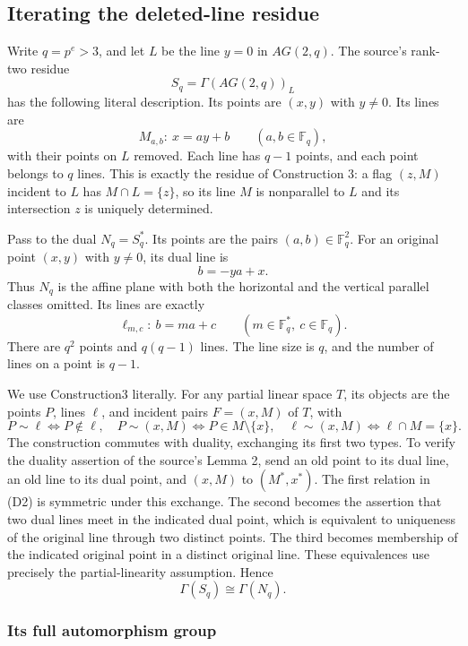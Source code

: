 \subsection{Iterating the deleted-line
residue}\label{iterating-the-deleted-line-residue}

Write \(q=p^e>3\), and let \(L\) be the line \(y=0\) in \(AG(2,q)\). The
source's rank-two residue \[
S_q=\Gamma(AG(2,q))_L
\] has the following literal description. Its points are \((x,y)\) with
\(y\ne0\). Its lines are \[
M_{a,b}:\ x=ay+b\qquad(a,b\in\mathbb F_q),
\] with their points on \(L\) removed. Each line has \(q-1\) points, and
each point belongs to \(q\) lines. This is exactly the residue of
Construction 3: a flag \((z,M)\) incident to \(L\) has
\(M\cap L=\{z\}\), so its line \(M\) is nonparallel to \(L\) and its
intersection \(z\) is uniquely determined.

Pass to the dual \(N_q=S_q^*\). Its points are the pairs
\((a,b)\in\mathbb F_q^2\). For an original point \((x,y)\) with
\(y\ne0\), its dual line is \[
b=-ya+x.
\] Thus \(N_q\) is the affine plane with both the horizontal and the
vertical parallel classes omitted. Its lines are exactly \[
\ell_{m,c}:\ b=ma+c\qquad(m\in\mathbb F_q^*,\ c\in\mathbb F_q).
\tag{D1}
\] There are \(q^2\) points and \(q(q-1)\) lines. The line size is
\(q\), and the number of lines on a point is \(q-1\).

We use Construction3 literally. For any partial linear space \(T\), its
objects are the points \(P\), lines \(\ell\), and incident pairs
\(F=(x,M)\) of \(T\), with \[
P\sim\ell\iff P\notin\ell,\quad
P\sim(x,M)\iff P\in M\setminus\{x\},\quad
\ell\sim(x,M)\iff\ell\cap M=\{x\}.
\tag{D2}
\] The construction commutes with duality, exchanging its first two
types. To verify the duality assertion of the source's Lemma 2, send an
old point to its dual line, an old line to its dual point, and \((x,M)\)
to \((M^*,x^*)\). The first relation in (D2) is symmetric under this
exchange. The second becomes the assertion that two dual lines meet in
the indicated dual point, which is equivalent to uniqueness of the
original line through two distinct points. The third becomes membership
of the indicated original point in a distinct original line. These
equivalences use precisely the partial-linearity assumption. Hence \[
\Gamma(S_q)\cong\Gamma(N_q).
\tag{D3}
\]

\subsubsection{Its full automorphism
group}\label{its-full-automorphism-group}

